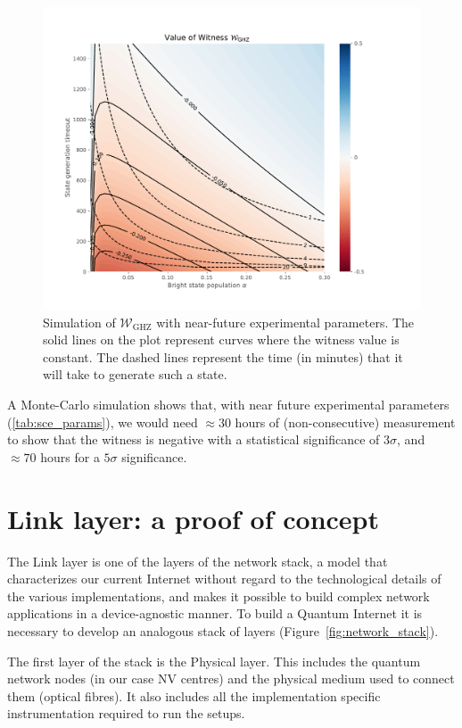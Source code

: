 \documentclass[a4paper, twoside]{article}
\begin{document}
\begin{figure}
	\includegraphics[width=\textwidth, trim=1cm 1cm 3cm 1cm 0cm]{../images/witness.pdf}
	\caption{Simulation of $\mathcal W_\text{GHZ}$ with near-future experimental parameters. The solid lines on the plot represent curves where the witness value is constant. The dashed lines represent the time (in minutes) that it will take to generate such a state.}
	\label{fig:witness}
\end{figure}

A Monte-Carlo simulation shows that, with near future experimental parameters (\autoref{tab:sce_params}), we would need $\approx 30$ hours of (non-consecutive) measurement to show that the witness is negative with a statistical significance of $3\sigma$, and $\approx 70$ hours for a $5\sigma$ significance.

\section{Link layer: a proof of concept}
\label{sec:link}

The Link layer is one of the layers of the network stack, a model that characterizes our current Internet without regard to the technological details of the various implementations, and makes it possible to build complex network applications in a device-agnostic manner. To build a Quantum Internet it is necessary to develop an analogous stack of layers (Figure~\ref{fig:network_stack}). 

The first layer of the stack is the Physical layer. This includes the quantum network nodes (in our case \ac{NV} centres) and the physical medium used to connect them (optical fibres). It also includes all the implementation specific instrumentation required to run the setups.
\end{document}
